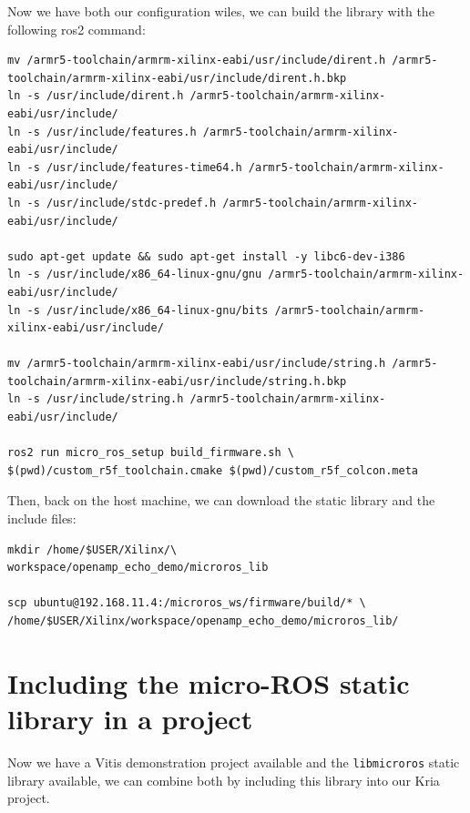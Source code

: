 \documentclass[10pt]{article}
\begin{document}
Now we have both our configuration wiles, we can build the library with the following ros2 command:
\begin{tcolorbox}
\begin{verbatim}
mv /armr5-toolchain/armrm-xilinx-eabi/usr/include/dirent.h /armr5-toolchain/armrm-xilinx-eabi/usr/include/dirent.h.bkp
ln -s /usr/include/dirent.h /armr5-toolchain/armrm-xilinx-eabi/usr/include/
ln -s /usr/include/features.h /armr5-toolchain/armrm-xilinx-eabi/usr/include/
ln -s /usr/include/features-time64.h /armr5-toolchain/armrm-xilinx-eabi/usr/include/
ln -s /usr/include/stdc-predef.h /armr5-toolchain/armrm-xilinx-eabi/usr/include/

sudo apt-get update && sudo apt-get install -y libc6-dev-i386
ln -s /usr/include/x86_64-linux-gnu/gnu /armr5-toolchain/armrm-xilinx-eabi/usr/include/
ln -s /usr/include/x86_64-linux-gnu/bits /armr5-toolchain/armrm-xilinx-eabi/usr/include/

mv /armr5-toolchain/armrm-xilinx-eabi/usr/include/string.h /armr5-toolchain/armrm-xilinx-eabi/usr/include/string.h.bkp
ln -s /usr/include/string.h /armr5-toolchain/armrm-xilinx-eabi/usr/include/

ros2 run micro_ros_setup build_firmware.sh \
$(pwd)/custom_r5f_toolchain.cmake $(pwd)/custom_r5f_colcon.meta
\end{verbatim}
\end{tcolorbox}

Then, back on the host machine, we can download the static library and the include files:
\begin{tcolorbox}
\begin{verbatim}
mkdir /home/$USER/Xilinx/\
workspace/openamp_echo_demo/microros_lib

scp ubuntu@192.168.11.4:/microros_ws/firmware/build/* \
/home/$USER/Xilinx/workspace/openamp_echo_demo/microros_lib/
\end{verbatim}
\end{tcolorbox}



\section{Including the micro-ROS static library in a project}
Now we have a Vitis demonstration project available and the \verb|libmicroros| static library
available, we can combine both by including this library into our Kria project.
\end{document}
